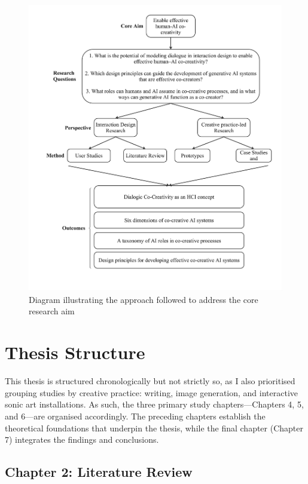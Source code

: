 \begin{figure}[hbt!]
    \centering
    \includegraphics[width=1\linewidth]{Intro - Frame 1 (2).jpg}
    \caption{Diagram illustrating the approach followed to address the core research aim}
    \label{fig:approach_figure}
\end{figure}

\clearpage

\section{Thesis Structure}

This thesis is structured chronologically but not strictly so, as I also prioritised grouping studies by creative practice: writing, image generation, and interactive sonic art installations. As such, the three primary study chapters—Chapters 4, 5, and 6—are organised accordingly. The preceding chapters establish the theoretical foundations that underpin the thesis, while the final chapter (Chapter 7) integrates the findings and conclusions.

\subsection{Chapter 2: Literature Review}

